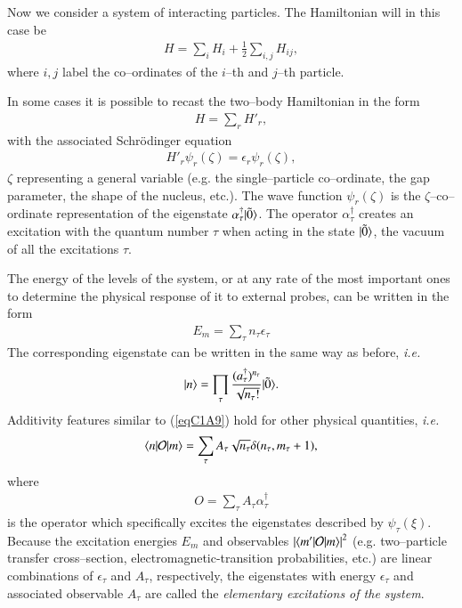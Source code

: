 Now we consider a system of interacting particles. The Hamiltonian will in this case be
\begin{align}\label{eqC1A6}
H=\sum_i H_i+\frac{1}{2}\sum_{i,j}H_{ij},
\end{align}
where $i,j$ label the co--ordinates of the $i$--th and $j$--th particle.

In some cases it is possible to recast the two--body Hamiltonian in the form
\begin{align}\label{eqC1A7}
H=\sum_r H'_r,
\end{align}
with the associated Schr\"odinger equation
\begin{align}\label{eqC1A8}
H'_r\psi_r(\zeta)=\epsilon_r \psi_r(\zeta),
\end{align}
$\zeta$ representing a general variable (e.g. the single--particle co--ordinate, the gap parameter, the shape of the nucleus, etc.). The wave function $\psi_r(\zeta)$ is the $\zeta$--co--ordinate representation of the eigenstate $\alpha_\tau^\dagger|{\tilde 0} \rangle$. The operator $\alpha_\tau^\dagger$ creates an excitation with the quantum number $\tau$ when acting in the state $|{\tilde 0} \rangle$, the vacuum of all the excitations $\tau$.



The energy of the levels of the system, or at any rate of the most important
ones to determine the physical response of it to external probes, can be written
in the form
\begin{align}\label{eqC1A9}
E_m=\sum_{\tau}n_\tau \epsilon_\tau
\end{align}
The corresponding eigenstate can be written in the same way as before, \textit{i.e.}
\begin{align}\label{eqC1A10}
|{n} \rangle=\prod_\tau\frac{(a_\tau^\dagger)^{n_\tau}}{\sqrt{n_\tau!}}|{\tilde 0} \rangle.
\end{align}
Additivity features similar to (\ref{eqC1A9}) hold for other physical quantities, \textit{i.e.}
\begin{align}\label{eqC1A11}
\langle {n|\mathcal O|m} \rangle=\sum_{\tau}A_\tau\sqrt{n_\tau} \delta(n_\tau,m_\tau+1),
\end{align}
where
\begin{align}\label{eqC1A12} O=\sum_{\tau}A_\tau \alpha_\tau^\dagger
\end{align}
is the operator which specifically excites the eigenstates described by $\psi_\tau(\xi)$.
Because the excitation energies $E_m$ and observables $\left|\langle {m'|\mathcal O|m} \rangle\right|^2$ (e.g. two--particle transfer cross--section, electromagnetic-transition probabilities, etc.) are
linear combinations of $\epsilon_\tau$ and $A_\tau$, respectively, the eigenstates with energy $\epsilon_\tau$
and associated observable $A_\tau$ are called the \textit{elementary excitations of the system}.


